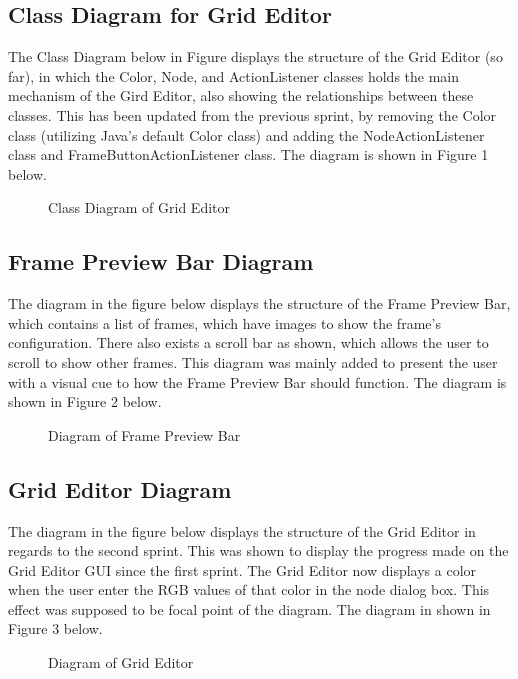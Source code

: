 \documentclass[12pt]{article}
\begin{document}
			\subsection {Class Diagram for Grid Editor}
				\forceindent The Class Diagram below in Figure displays the structure of the Grid Editor (so far), in which the Color, Node, and ActionListener classes holds the main mechanism of the Gird Editor, also showing the relationships between these classes. This has been updated from the previous sprint, by removing the Color class (utilizing Java's default Color class) and adding the NodeActionListener class and FrameButtonActionListener class. The diagram is shown in Figure 1 below.
				
				\begin{figure}[ht!]
					\centering
					\caption{Class Diagram of Grid Editor \label{overflow}}
				\end{figure}
			
			\subsection {Frame Preview Bar Diagram}
			\forceindent The diagram in the figure below displays the structure of the Frame Preview Bar, which contains a list of frames, which have images to show the frame's configuration. There also exists a scroll bar as shown, which allows the user to scroll to show other frames. This diagram was mainly added to present the user with a visual cue to how the Frame Preview Bar should function. The diagram is shown in Figure 2 below.
			
			\begin{figure}[ht!]
				\centering
				\caption{Diagram of Frame Preview Bar \label{overflow}}
			\end{figure}
			
			\subsection {Grid Editor Diagram}
			\forceindent The diagram in the figure below displays the structure of the Grid Editor in regards to the second sprint. This was shown to display the progress made on the Grid Editor GUI since the first sprint. The Grid Editor now displays a color when the user enter the RGB values of that color in the node dialog box. This effect was supposed to be focal point of the diagram. The diagram in shown in Figure 3 below.
			
			\begin{figure}[ht!]
				\centering
				\caption{Diagram of Grid Editor \label{overflow}}
			\end{figure}
		
			
		
		\clearpage
		
		
\end{document}
